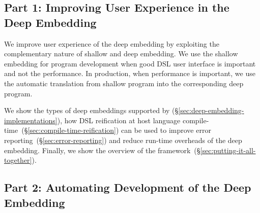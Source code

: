 \subsection{Part 1: Improving User Experience in the Deep Embedding}
\label{sec:user-experience}

We improve user experience of the deep embedding by exploiting the complementary nature of shallow and deep embedding.
 We use the shallow embedding for program development when good DSL user interface is important and not the performance.
 In production, when performance is important, we use the automatic translation from shallow program
 into the corresponding deep program.


We show the types of deep embeddings supported by \yy (\S \ref{sec:deep-embedding-implementations}), how DSL reification at host language compile-time~(\S \ref{sec:compile-time-reification}) can be used to improve error reporting~(\S \ref{sec:error-reporting}) and reduce
run-time overheads of the deep embedding. Finally, we show the overview of the framework~(\S \ref{sec:putting-it-all-together}).



\subsection{Part 2: Automating Development of the Deep Embedding}
\label{sec:automating-developemnt}


